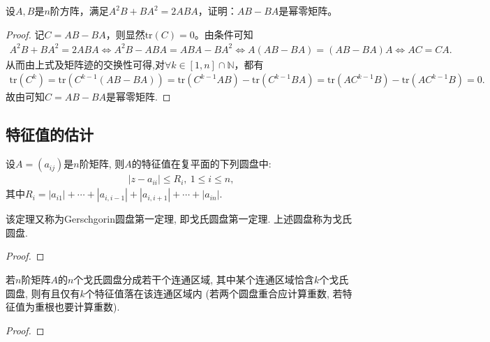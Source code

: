 \documentclass[../../main.tex]{subfiles}%
\begin{document}
\begin{example}
设$A,B$是$n$阶方阵，满足$A^2B + BA^2 = 2ABA$，证明：$AB - BA$是幂零矩阵。 
\end{example}
\begin{proof}

记$C = AB - BA$，则显然$\mathrm{tr}(C)=0$。由条件可知
\begin{align*}
A^2B + BA^2 = 2ABA \Longleftrightarrow A^2B - ABA = ABA - BA^2 
\Longleftrightarrow A(AB - BA) = (AB - BA)A \Longleftrightarrow AC = CA.
\end{align*}
从而由上式及矩阵迹的交换性可得,对$\forall k\in [1,n]\cap \mathbb{N}$，都有
\begin{align*}
\mathrm{tr}(C^k) = \mathrm{tr}(C^{k - 1}(AB - BA)) = \mathrm{tr}(C^{k - 1}AB) - \mathrm{tr}(C^{k - 1}BA) 
= \mathrm{tr}(AC^{k - 1}B) - \mathrm{tr}(AC^{k - 1}B) = 0.
\end{align*}
故由可知$C=AB-BA$是幂零矩阵.

\end{proof}



\subsection{特征值的估计}

\begin{theorem}[第一圆盘定理]\label{theorem:第一圆盘定理}
设\(A = (a_{ij})\)是\(n\)阶矩阵, 则\(A\)的特征值在复平面的下列圆盘中:
\begin{align*}
|z - a_{ii}| \leqslant  R_{i},\ 1 \leqslant  i \leqslant  n,
\end{align*}
其中\(R_{i} = |a_{i1}| + \cdots + |a_{i,i - 1}| + |a_{i,i + 1}| + \cdots + |a_{in}|\).
\end{theorem}
\begin{remark}
该定理又称为Gerschgorin圆盘第一定理, 即戈氏圆盘第一定理. 上述圆盘称为戈氏圆盘.
\end{remark}
\begin{proof}



\end{proof}

\begin{theorem}[第二圆盘定理]\label{theorem:第二圆盘定理}
若\(n\)阶矩阵\(A\)的\(n\)个戈氏圆盘分成若干个连通区域, 其中某个连通区域恰含\(k\)个戈氏圆盘, 则有且仅有\(k\)个特征值落在该连通区域内 (若两个圆盘重合应计算重数, 若特征值为重根也要计算重数).
\end{theorem}
\begin{proof}



\end{proof}
\end{document}

